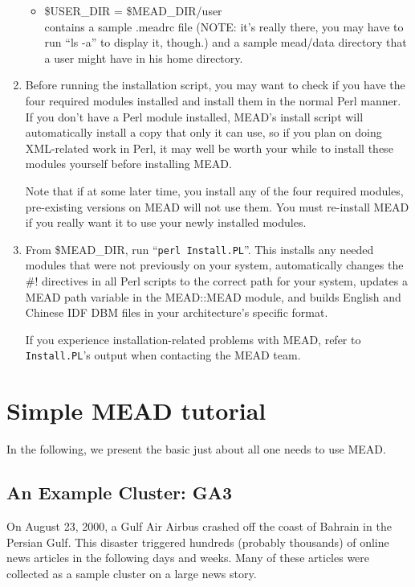 \documentclass[10pt]{article}
\begin{document}
\begin{enumerate}
\begin {itemize}
\item \$USER\_DIR    = \$MEAD\_DIR/user\\
contains a sample .meadrc file (NOTE: it's really there, you
may have to run ``ls -a'' to display it, though.) and a sample
mead/data directory that a user might have in his home directory.

\end {itemize}

\item Before running the installation script, you may want to
check if you have the four required modules installed and install
them in the normal Perl manner.  If you don't have a Perl module
installed, MEAD's install script 
will automatically install a copy that only it can use, so if
you plan on doing XML-related work in Perl, it may well be worth
your while to install these modules yourself before installing MEAD.

Note that if at some later time, you install any of the four
required modules, pre-existing versions on MEAD will not use
them.  You must re-install MEAD if you really want it to use your
newly installed modules.

\item From \$MEAD\_DIR, run ``\verb|perl Install.PL|''.  
This installs any needed modules that were not previously on your
system, automatically changes the \#! directives in all Perl 
scripts to the correct path for your system,
updates a MEAD path variable in the MEAD::MEAD module, and
builds English and Chinese IDF DBM files in your architecture's
specific format.

If you experience
installation-related problems with MEAD, refer to 
\verb|Install.PL|'s output when contacting the MEAD team.

\end{enumerate}






\section{Simple MEAD tutorial}

In the following, we present the basic just about all one needs to use MEAD.

\subsection{An Example Cluster: GA3}

On August 23, 2000, a Gulf Air Airbus crashed off the coast of
Bahrain in the Persian Gulf.  This disaster triggered hundreds
(probably thousands) of online news articles in the following
days and weeks.  Many of these articles were collected as a
sample cluster on a large news story.
\end{document}
